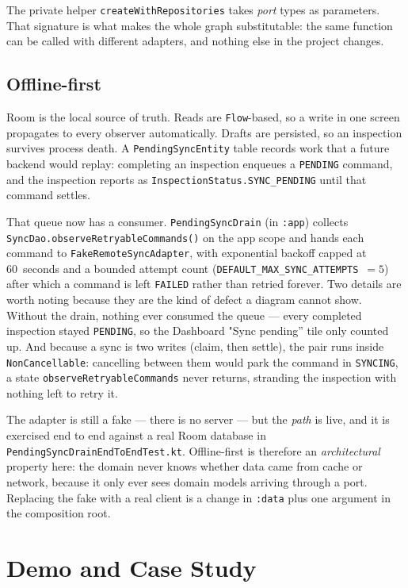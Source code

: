 \documentclass[11pt,a4paper]{article}
\newcommand{\mdl}[1]{\texttt{#1}}
\newcommand{\file}[1]{{\small\texttt{#1}}}
\begin{document}
The private helper \texttt{createWithRepositories} takes \emph{port} types as
parameters. That signature is what makes the whole graph substitutable: the same
function can be called with different adapters, and nothing else in the project
changes.

\subsection{Offline-first}

Room is the local source of truth. Reads are \texttt{Flow}-based, so a write in
one screen propagates to every observer automatically. Drafts are persisted, so
an inspection survives process death. A \texttt{PendingSyncEntity} table records
work that a future backend would replay: completing an inspection enqueues a
\texttt{PENDING} command, and the inspection reports as
\texttt{InspectionStatus.SYNC\_PENDING} until that command settles.

That queue now has a consumer. \file{PendingSyncDrain} (in \mdl{:app}) collects
\texttt{SyncDao.observeRetryableCommands()} on the app scope and hands each
command to \file{FakeRemoteSyncAdapter}, with exponential backoff capped at
60~seconds and a bounded attempt count
(\texttt{DEFAULT\_MAX\_SYNC\_ATTEMPTS}~$=5$) after which a command is left
\texttt{FAILED} rather than retried forever. Two details are worth noting because
they are the kind of defect a diagram cannot show. Without the drain, nothing
ever consumed the queue --- every completed inspection stayed \texttt{PENDING},
so the Dashboard "Sync pending'' tile only counted up. And because a sync is two
writes (claim, then settle), the pair runs inside \texttt{NonCancellable}:
cancelling between them would park the command in \texttt{SYNCING}, a state
\texttt{observeRetryableCommands} never returns, stranding the inspection with
nothing left to retry it.

The adapter is still a fake --- there is no server --- but the \emph{path} is
live, and it is exercised end to end against a real Room database in
\file{PendingSyncDrainEndToEndTest.kt}. Offline-first is therefore an
\emph{architectural} property here: the domain never knows whether data came from
cache or network, because it only ever sees domain models arriving through a
port. Replacing the fake with a real client is a change in \mdl{:data} plus one
argument in the composition root.

\section{Demo and Case Study}
\end{document}
